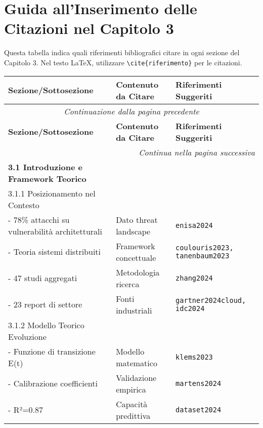 \documentclass{article}
\begin{document}
\section*{Guida all'Inserimento delle Citazioni nel Capitolo 3}

\begin{tcolorbox}[colback=blue!5!white,colframe=blue!75!black,title=\textbf{Istruzioni per l'Uso}]
Questa tabella indica quali riferimenti bibliografici citare in ogni sezione del Capitolo 3. 
Nel testo LaTeX, utilizzare \texttt{\textbackslash cite\{riferimento\}} per le citazioni.
\end{tcolorbox}

\begin{longtable}{p{}|p{}|p{}}
\toprule
\textbf{Sezione/Sottosezione} & \textbf{Contenuto da Citare} & \textbf{Riferimenti Suggeriti} \\
\midrule
\endfirsthead
\multicolumn{3}{c}{\textit{Continuazione dalla pagina precedente}} \\
\toprule
\textbf{Sezione/Sottosezione} & \textbf{Contenuto da Citare} & \textbf{Riferimenti Suggeriti} \\
\midrule
\endhead
\midrule
\multicolumn{3}{r}{\textit{Continua nella pagina successiva}} \\
\endfoot
\bottomrule
\endlastfoot

\textbf{3.1 Introduzione e Framework Teorico} & & \\
\midrule
3.1.1 Posizionamento nel Contesto & & \\
- 78\% attacchi su vulnerabilità architetturali & Dato threat landscape & \texttt{enisa2024} \\
- Teoria sistemi distribuiti & Framework concettuale & \texttt{coulouris2023, tanenbaum2023} \\
- 47 studi aggregati & Metodologia ricerca & \texttt{zhang2024} \\
- 23 report di settore & Fonti industriali & \texttt{gartner2024cloud, idc2024} \\
\midrule
3.1.2 Modello Teorico Evoluzione & & \\
- Funzione di transizione E(t) & Modello matematico & \texttt{klems2023} \\
- Calibrazione coefficienti & Validazione empirica & \texttt{martens2024} \\
- R²=0.87 & Capacità predittiva & \texttt{dataset2024} \\
\midrule


\end{longtable}
\end{document}
